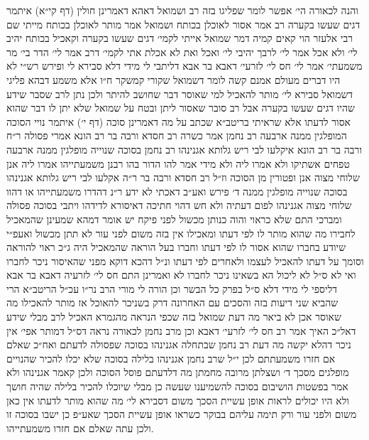 \documentclass[12pt, openany]{book}
\begin{document}
\begin{multicols}{2}
והנה לכאורה הי׳ אפשר לומר שפליגו בזה רב ושמואל דאהא דאמרינן חולין (דף קי״א) איתמר דגים שעשו בקערה רב אמר אסור לאוכלן בכותח ושמואל אמר מותר לאוכלן בכותח מייתי שם רבי אלעזר הוי קאים קמיה דמר שמואל אייתי לקמי׳ דגים שעשו בקערה וקאכיל בכותח יהיב לי׳ ולא אכל אמר לי׳ לרבך יהיבי לי׳ ואכל ואת לא אכלת אתי לקמי׳ דרב אמר לי׳ הדר בי׳ מר משמעתי׳ אמר לי׳ חס לי׳ לזרעי׳ דאבא בר אבא דליתבי לי מידי דלא סבירא לי ופירש רש״י לא היו דברים מעולם אמנם קשה לומר דשמואל שקורי קמשקר ח״ו אלא משמע דבהא פליגי דשמואל סבירא לי׳ מותר להאכיל למי שאוסר דבר שחושב להיתר ולכן נתן לרב שסבר שידע שהיו דגים שעשו בקערה אבל רב סובר שאסור ליתן ובטח על שמואל שלא יתן לו דבר שהוא אסור לדעתו אלא שראיתי בריטב״א שכתב על מה דאמרינן סוכה (דף י׳) איתמר נויי הסוכה המופלגין ממנה ארבעה רב נחמן אמר כשרה רב חסדא ורבה בר רב הונא אמרי פסולה ר״ח ורבה בר רב הונא איקלעו לבי ריש גלותא אגנינהו רב נחמן בסוכה שנוייה מופלגין ממנה ארבעה טפחים אשתיקו ולא אמרו ליה ולא מידי אמר להו הדור בהו רבנן משמעתייהו אמרו ליה אנן שלוחי מצוה אנן ופטורין מן הסוכה וז״ל רב חסדא ורבה בר ר״ה אקלעו לבי ריש גלותא אגנינהו בסוכה שנוייה מופלגין ממנה ד׳ פירש ואע״ב דאכתי לא ידע ר״נ דהדרו משמעתייהו או דהוו שלוחי מצוה אגנינהו לפום דעתיה ולא חש דהוי חתיכה דאיסורא לדידהו ויתבי בסוכה פסולה ומברכי התם שלא כראוי והוה כנותן מכשול לפני פיקח יש אומר דמהא שמעינן שהמאכיל לחבירו מה שהוא מותר לו לפי דעתו ומאכילו אין בזה משום לפני עור לא תתן מכשול ואעפ״י שיודע בחברו שהוא אסור לו לפי דעתו וחברו בעל הוראה שהמאכיל היה ג״כ ראוי להוראה וסומך על דעתו להאכיל לעצמו ולאחרים לפי דעתו ונ״ל דהכא דוקא מפני שהאיסור ניכר לחברו ואי לא ס״ל לא ליכול הא בשאינו ניכר לחברו לא ואמרינן התם חס לי׳ לזרעיה דאבא בר אבא דליספי לי מידי דלא ס״ל בפרק כל הבשר וכן הורה לי מורי הרב נר״ו עכ״ל הריטב״א הרי שהביא שני דיעות בזה והסכים עם האחרונה דרק בשניכר להאוכל אז מותר להאכילו מה שאוסר אכן לא ביאר מה דעת שמואל בזה שכפי הנראה מהגמרא האכיל לרב מבלי שידע דאל״כ האיך אמר רב חס לי׳ לזרעי׳ דאבא וכן מרב נחמן לכאורה נראה דס״ל דמותר אפי׳ אין ניכר דהלא יקשה מה דעת רב נחמן שבתחלה אגנינהו בסוכה שפסולה לדעתם ואח״כ שאלם אם חזרו משמעתתם לכן י״ל שרב נחמן אגנינהו בלילה בסוכה שלא יכלו להכיר שהנויים מופלגים מסכך ד׳ ושצלתן מרובה מחמתן מה דלדעתם פוסל הסוכה ולכן קאמר אגנינהו ולא אמר בפשטות הושיבום בסוכה להשמיענו שעשה כן מבלי שיוכלו להכיר בלילה שהיה חושך ולא היו יכולים לראות אופן עשיית הסכך משום דסבירא לי׳ מה שהוא מותר לדעתו אין כאן משום ולפני עור ורק תימה עליהם בבוקר כשראו אופן עשיית הסכך שאע״פ כן ישבו בסוכה זו ולכן עתה שאלם אם חזרו משמעתייהו.\\\vspace{0pt}


\end{multicols}
\end{document}
